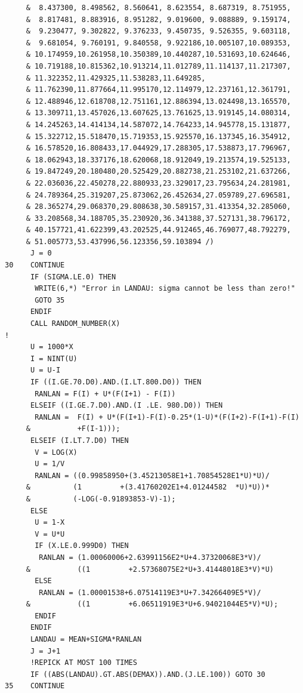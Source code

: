 \begin{lstlisting}
     &  8.437300, 8.498562, 8.560641, 8.623554, 8.687319, 8.751955,
     &  8.817481, 8.883916, 8.951282, 9.019600, 9.088889, 9.159174,
     &  9.230477, 9.302822, 9.376233, 9.450735, 9.526355, 9.603118,
     &  9.681054, 9.760191, 9.840558, 9.922186,10.005107,10.089353,
     & 10.174959,10.261958,10.350389,10.440287,10.531693,10.624646,
     & 10.719188,10.815362,10.913214,11.012789,11.114137,11.217307,
     & 11.322352,11.429325,11.538283,11.649285,
     & 11.762390,11.877664,11.995170,12.114979,12.237161,12.361791,
     & 12.488946,12.618708,12.751161,12.886394,13.024498,13.165570,
     & 13.309711,13.457026,13.607625,13.761625,13.919145,14.080314,
     & 14.245263,14.414134,14.587072,14.764233,14.945778,15.131877,
     & 15.322712,15.518470,15.719353,15.925570,16.137345,16.354912,
     & 16.578520,16.808433,17.044929,17.288305,17.538873,17.796967,
     & 18.062943,18.337176,18.620068,18.912049,19.213574,19.525133,
     & 19.847249,20.180480,20.525429,20.882738,21.253102,21.637266,
     & 22.036036,22.450278,22.880933,23.329017,23.795634,24.281981,
     & 24.789364,25.319207,25.873062,26.452634,27.059789,27.696581,
     & 28.365274,29.068370,29.808638,30.589157,31.413354,32.285060,
     & 33.208568,34.188705,35.230920,36.341388,37.527131,38.796172,
     & 40.157721,41.622399,43.202525,44.912465,46.769077,48.792279,
     & 51.005773,53.437996,56.123356,59.103894 /)
      J = 0
30    CONTINUE
      IF (SIGMA.LE.0) THEN 
       WRITE(6,*) "Error in LANDAU: sigma cannot be less than zero!"
       GOTO 35
      ENDIF
      CALL RANDOM_NUMBER(X)
!
      U = 1000*X
      I = NINT(U)
      U = U-I
      IF ((I.GE.70.D0).AND.(I.LT.800.D0)) THEN
       RANLAN = F(I) + U*(F(I+1) - F(I))
      ELSEIF ((I.GE.7.D0).AND.(I .LE. 980.D0)) THEN
       RANLAN =  F(I) + U*(F(I+1)-F(I)-0.25*(1-U)*(F(I+2)-F(I+1)-F(I)
     &           +F(I-1)));
      ELSEIF (I.LT.7.D0) THEN
       V = LOG(X)
       U = 1/V
       RANLAN = ((0.99858950+(3.45213058E1+1.70854528E1*U)*U)/
     &          (1         +(3.41760202E1+4.01244582  *U)*U))*
     &          (-LOG(-0.91893853-V)-1);
      ELSE
       U = 1-X
       V = U*U
       IF (X.LE.0.999D0) THEN
        RANLAN = (1.00060006+2.63991156E2*U+4.37320068E3*V)/
     &           ((1         +2.57368075E2*U+3.41448018E3*V)*U)
       ELSE
        RANLAN = (1.00001538+6.07514119E3*U+7.34266409E5*V)/
     &           ((1         +6.06511919E3*U+6.94021044E5*V)*U);
       ENDIF
      ENDIF
      LANDAU = MEAN+SIGMA*RANLAN
      J = J+1
      !REPICK AT MOST 100 TIMES
      IF ((ABS(LANDAU).GT.ABS(DEMAX)).AND.(J.LE.100)) GOTO 30
35    CONTINUE

\end{lstlisting}
